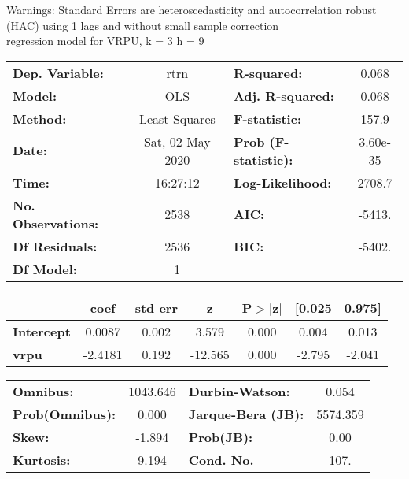Warnings: \newline
 [1] Standard Errors are heteroscedasticity and autocorrelation robust (HAC) using 1 lags and without small sample correction\\ 

regression model for VRPU, k = 3 h = 9\begin{center}
\begin{tabular}{lclc}
\toprule
\textbf{Dep. Variable:}    &       rtrn       & \textbf{  R-squared:         } &     0.068   \\
\textbf{Model:}            &       OLS        & \textbf{  Adj. R-squared:    } &     0.068   \\
\textbf{Method:}           &  Least Squares   & \textbf{  F-statistic:       } &     157.9   \\
\textbf{Date:}             & Sat, 02 May 2020 & \textbf{  Prob (F-statistic):} &  3.60e-35   \\
\textbf{Time:}             &     16:27:12     & \textbf{  Log-Likelihood:    } &    2708.7   \\
\textbf{No. Observations:} &        2538      & \textbf{  AIC:               } &    -5413.   \\
\textbf{Df Residuals:}     &        2536      & \textbf{  BIC:               } &    -5402.   \\
\textbf{Df Model:}         &           1      & \textbf{                     } &             \\
\bottomrule
\end{tabular}
\begin{tabular}{lcccccc}
                   & \textbf{coef} & \textbf{std err} & \textbf{z} & \textbf{P$> |$z$|$} & \textbf{[0.025} & \textbf{0.975]}  \\
\midrule
\textbf{Intercept} &       0.0087  &        0.002     &     3.579  &         0.000        &        0.004    &        0.013     \\
\textbf{vrpu}      &      -2.4181  &        0.192     &   -12.565  &         0.000        &       -2.795    &       -2.041     \\
\bottomrule
\end{tabular}
\begin{tabular}{lclc}
\textbf{Omnibus:}       & 1043.646 & \textbf{  Durbin-Watson:     } &    0.054  \\
\textbf{Prob(Omnibus):} &   0.000  & \textbf{  Jarque-Bera (JB):  } & 5574.359  \\
\textbf{Skew:}          &  -1.894  & \textbf{  Prob(JB):          } &     0.00  \\
\textbf{Kurtosis:}      &   9.194  & \textbf{  Cond. No.          } &     107.  \\
\bottomrule
\end{tabular}
\end{center}

